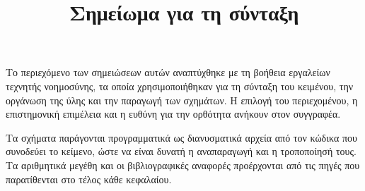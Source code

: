 \title{Σημείωμα για τη σύνταξη}

Το περιεχόμενο των σημειώσεων αυτών αναπτύχθηκε με τη βοήθεια εργαλείων τεχνητής
νοημοσύνης, τα οποία χρησιμοποιήθηκαν για τη σύνταξη του κειμένου, την οργάνωση της ύλης
και την παραγωγή των σχημάτων. Η επιλογή του περιεχομένου, η επιστημονική επιμέλεια και η
ευθύνη για την ορθότητα ανήκουν στον συγγραφέα.

Τα σχήματα παράγονται προγραμματικά ως διανυσματικά αρχεία από τον κώδικα που συνοδεύει το
κείμενο, ώστε να είναι δυνατή η αναπαραγωγή και η τροποποίησή τους.
Τα αριθμητικά μεγέθη και οι βιβλιογραφικές αναφορές προέρχονται από τις πηγές που
παρατίθενται στο τέλος κάθε κεφαλαίου.
